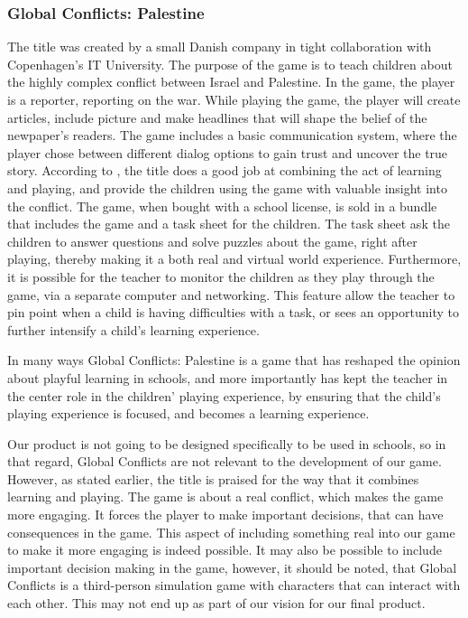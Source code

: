 \subsubsection{Global Conflicts: Palestine}

The title was created by a small Danish company in tight collaboration with Copenhagen's IT University.
The purpose of the game is to teach children about the highly complex conflict between Israel and Palestine. In the game, the player is a reporter, reporting on the war. While playing the game, the player will create articles, include picture and make headlines that will shape the belief of the newpaper's readers. The game includes a basic communication system, where the player chose between different dialog options to gain trust and uncover the true story. According to \cite{laeringpaaspil}, the title does a good job at combining the act of learning and playing, and provide the children using the game with valuable insight into the conflict.
The game, when bought with a school license, is sold in a bundle that includes the game and a task sheet for the children.
The task sheet ask the children to answer questions and solve puzzles about the game, right after playing, thereby making it a both real and virtual world experience.
Furthermore, it is possible for the teacher to monitor the children as they play through the game, via a separate computer and networking.
This feature allow the teacher to pin point when a child is having difficulties with a task, or sees an opportunity to further intensify a child's learning experience.\newline

In many ways Global Conflicts: Palestine is a game that has reshaped the opinion about playful learning in schools, and more importantly has kept the teacher in the center role in the children' playing experience, by ensuring that the child's playing experience is focused, and becomes a learning experience.\cite{laeringpaaspil}\newline

 Our product is not going to be designed specifically to be used in schools, so in that regard, Global Conflicts are not relevant to the development of our game. However, as stated earlier, the title is praised for the way that it combines learning and playing. The game is about a real conflict, which makes the game more engaging. It forces the player to make important decisions, that can have consequences in the game. This aspect of including something real into our game to make it more engaging is indeed possible. It may also be possible to include important decision making in the game, however, it should be noted, that Global Conflicts is a third-person simulation game with characters that can interact with each other. This may not end up as part of our vision for our final product.


